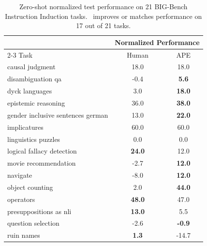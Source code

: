 \begin{table}[H]
\centering
 \label{tab:title} 
\caption{Zero-shot normalized test performance on 21 BIG-Bench Instruction Induction tasks. \algname~improves or matches performance on 17 out of 21 tasks.}\label{table:bbii_results}
\begin{tabular}{lcc} 
\toprule
 & \multicolumn{2}{c}{Normalized Performance}  \\ \cmidrule{2-3}
Task                              & \multicolumn{1}{c}{Human} & \multicolumn{1}{c}{APE}  \\ \midrule
causal judgment & 18.0                        & 18.0                       \\
disambiguation qa                 & -0.4                     & \textbf{5.6}                     \\
dyck languages                    & 3.0                         & \textbf{18.0}                       \\
epistemic reasoning               & 36.0                        & \textbf{38.0}                       \\
gender inclusive sentences german & 13.0                        & \textbf{22.0}                       \\
implicatures                      & 60.0                        & 60.0                       \\
linguistics puzzles               & 0.0                         & 0.0                        \\
logical fallacy detection         & \textbf{24.0}                        & 12.0                       \\
movie recommendation              & -2.7                     & \textbf{12.0}                       \\
navigate                          & -8.0                        & \textbf{12.0}                       \\
object counting                   & 2.0                         & \textbf{44.0}                       \\
operators                         & \textbf{48.0}                        & 47.0                       \\
presuppositions as nli            & \textbf{13.0}                        & 5.5                      \\
question selection                & -2.6                     & \textbf{-0.9}                    \\
ruin names                        & \textbf{1.3}                       & -14.7                   \\

\end{tabular}
\end{table}
